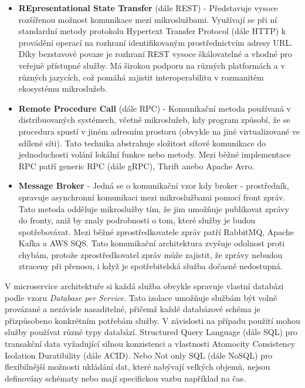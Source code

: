 \begin{itemize}
    \item \textbf{REpresentational State Transfer} (dále REST) - Představuje vysoce rozšířenou možnost komunikace mezi mikroslužbami. Využívají se při ní standardní metody protokolu Hypertext Transfer Protocol (dále HTTP) k provádění operací na rozhraní identifikovaným prostřednictvím adresy URL. \cite{Newman2015} Díky bezstavové povaze je rozhraní REST vysoce škálovatelné a vhodné pro veřejně přístupné služby. Má širokou podporu na různých platformách a v různých jazycích, což pomáhá zajistit interoperabilitu v rozmanitém ekosystému mikroslužeb.
    \item \textbf{Remote Procedure Call} (dále RPC) - Komunikační metoda používaná v distribuovaných systémech, včetně mikroslužeb, kdy program způsobí, že se procedura spustí v jiném adresním prostoru (obvykle na jiné virtualizované ve sdílené síti). \cite{Sazanavets2022} Tato technika abstrahuje složitost síťové komunikace do jednoduchosti volání lokální funkce nebo metody. Mezi běžné implementace RPC patří generic RPC (dále gRPC), Thrift anebo Apache Avro.
    \item \textbf{Message Broker} - Jedná se o komunikační vzor kdy broker - prostředník, spravuje asynchronní komunikaci mezi mikroslužbami pomocí front zpráv. Tato metoda odděluje mikroslužby tím, že jim umožňuje publikovat zprávy do fronty, aniž by znaly podrobnosti o tom, které služby je budou spotřebovávat. \cite{Williams2023} Mezi běžné zprostředkovatele zpráv patří RabbitMQ, Apache Kafka a AWS SQS. Tato komunikační architektura zvyšuje odolnost proti chybám, protože zprostředkovatel zpráv může zajistit, že zprávy nebudou ztraceny při přenosu, i když je spotřebitelská služba dočasně nedostupná. 
\end{itemize}


V microservice architektuře si každá služba obvykle spravuje vlastní databázi podle vzoru \emph{Database per Service}. Tato izolace umožňuje službám být volně provázané a nezávisle nasaditelné, přičemž každé databázové schéma je přizpůsobeno konkrétním potřebám služby. \cite{Williams2023} V závislosti na případu použití mohou služby používat různé typy databází. Structured Query Language (dále SQL) pro transakční data vyžadující silnou konzistenci a vlastnosti Atomocity Consistency Isolation Duratibility (dále ACID). Nebo Not only SQL (dále NoSQL) pro flexibilnější možnosti ukládání dat, které nabývají velkých objemů, nejsou definovány schématy nebo mají specifickou vazbu například na čas. 

